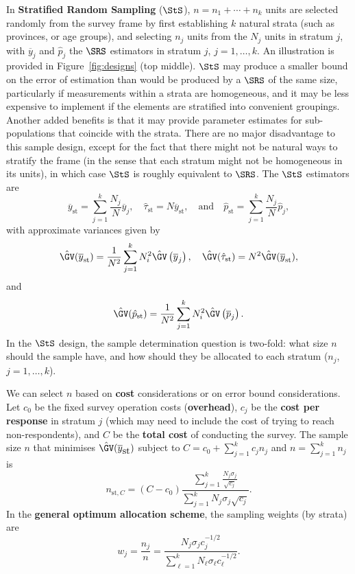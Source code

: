 In \textbf{Stratified Random Sampling} ($\StS$), $n=n_1+\cdots+n_k$ units are selected randomly from the survey frame by first establishing $k$ natural strata (such as provinces, or age groups), and selecting $n_j$ units from the $N_j$ units in stratum $j$, with $\overline{y}_j$ and $\hat{p}_j$ the $\SRS$ estimators in stratum $j$, $j=1,\ldots, k$. An illustration is provided in Figure~\ref{fig:designs} (top middle). \newpage\noindent $\StS$ may produce a smaller bound on the error of estimation than would be produced by a $\SRS$ of the same size, particularly if measurements within a strata are homogeneous, and it may be less expensive to implement if the elements are stratified into convenient groupings. Another added benefits is that it may provide parameter estimates for sub-populations that coincide with the strata. There are no major disadvantage to this sample design, except for the fact that there might not be natural ways to stratify the frame (in the sense that each stratum might not be homogeneous in its units), in which case $\StS$ is roughly equivalent to $\SRS$. \newl The $\StS$ estimators are 
$$\overline{y}_{\textrm{st}}=\sum_{j=1}^k \frac{N_j}{N}\overline{y}_j, \quad \hat{\tau}_{\textrm{st}}=N\overline{y}_{\textrm{st}}, \quad\mbox{and}\quad \hat{p}_{\textrm{st}}=\sum_{j=1}^k \frac{N_j}{N}\hat{p}_j,$$ with approximate variances given by 
$$\hat{\GV}(\overline{y}_{\textrm{st}})=\frac{1}{N^2}\sum_{j=1}^kN_i^2\hat{\GV}\left(\overline{y}_j\right),\quad \hat{\GV}(\hat{\tau}_{\textrm{st}})=N^2\hat{\GV}(\overline{y}_{\textrm{st}}),$$ and $$\hat{\GV}(\hat{p}_{\textrm{st}})=\frac{1}{N^2}\sum_{j=1}^kN_i^2\hat{\GV}\left(\overline{p}_j\right).$$
In the $\StS$ design, the sample determination question is two-fold: what size $n$ should the sample have, and how should they be allocated to each stratum ($n_j$, $j=1,\ldots,k$). \par We can select $n$ based on \textbf{cost} considerations or on error bound considerations. Let $c_0$ be the fixed survey operation costs (\textbf{overhead}), $c_j$ be the \textbf{cost per response} in  stratum $j$ (which may need to include the cost of trying to reach non-respondents), and $C$ be the \textbf{total cost} of conducting the survey. The sample size $n$ that minimises  $\hat{\GV}(\overline{y}_{\mbox{st}})$ subject to   $C=c_0+\sum_{j=1}^kc_jn_j$ and $n=\sum_{j=1}^kn_j$ is $$n_{\textrm{st},C}=(C-c_0)\frac{\sum_{j=1}^k \frac{N_j\sigma_j}{\sqrt{c_j}}}{\sum_{j=1}^k N_j\sigma_j\sqrt{c_j}}.$$ In the \textbf{general optimum allocation scheme}, the sampling weights (by strata) are $$w_j=\frac{n_j}{n}=\frac{N_j\sigma_jc_{j}^{-1/2}}{\sum_{\ell=1}^kN_{\ell}\sigma_{\ell}c_{\ell}^{-1/2}}.$$ 

